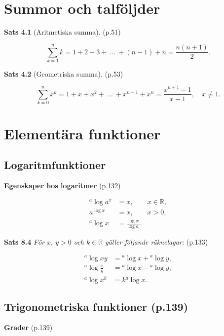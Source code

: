 \documentclass[11pt]{article}
\begin{document}
\section{Summor och talföljder}

\textbf{Sats 4.1} (Aritmetiska summa). (p.51)

\begin{equation}
    \sum_{k = 1}^n k = 1 + 2 + 3 +\ ...\ + (n - 1) + n = \frac{n(n + 1)}{2}.
\end{equation}

\textbf{Sats 4.2} (Geometriska summa). (p.53)

\begin{equation}
    \sum_{k = 0}^n x^k = 1 + x + x^2 +\ ...\ + x^{n - 1} + x^n = \frac{x^{n + 1} - 1}{x - 1}, \quad x \neq 1.
\end{equation}

\section{Elementära funktioner}

\subsection{Logaritmfunktioner}

\textbf{Egenskaper hos logaritmer} (p.132)

\begin{align}
    {}^a\log a^x &= x, \qquad x \in \mathbb{R},\\
    a^{\log x} &= x, \qquad x > 0,\\
    {}^a\log x &= \frac{\log{x}}{\log{a}}.
\end{align}

\textbf{Sats 8.4} \textit{För $x,\ y > 0$ och $k \in \mathbb{R}$ gäller följande räknelagar:} (p.133)

\begin{align}
    {}^a\log xy &= {}^a\log x + {}^a\log y,\\
    {}^a\log \frac{x}{y} &= {}^a\log x - {}^a\log y,\\
    {}^a\log x^k &= k{}^a\log x.
\end{align}

\subsection{Trigonometriska funktioner (p.139)}

\textbf{Grader} (p.139)
\end{document}
